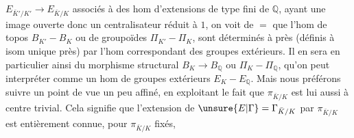 $E_{\bar K'/K'}\longrightarrow E_{\bar K/K}$ associés à des hom  d'extensions de type fini de $\mathbb Q$, ayant une image ouverte donc un centralisateur réduit à $1$, on voit de $=$ que l'hom de topos $B_{K'}-B_K$ ou de groupoïdes $\Pi_{K'}-\Pi_K$, sont déterminés à  près (définis à isom unique près) par l'hom correspondant des groupes extérieurs. Il en sera en particulier ainsi du morphisme structural $B_K\longrightarrow B_{\mathbb Q}$ ou $\Pi_K-\Pi_{\mathbb Q}$, qu'on peut interpréter  comme un hom de groupes  extérieurs $E_K-E_{\mathbb Q}$. Mais nous préférons suivre un point de vue un peu affiné, en exploitant le fait que $\pi_{\bar K/K}$ est lui aussi à centre trivial. Cela signifie que l'extension de $\unsure{E|\Gamma}=\Gamma_{\bar K/K}$ par $\pi_{\bar K/K}$ est entièrement connue,  pour $\pi_{\bar K/K}$  fixés,
